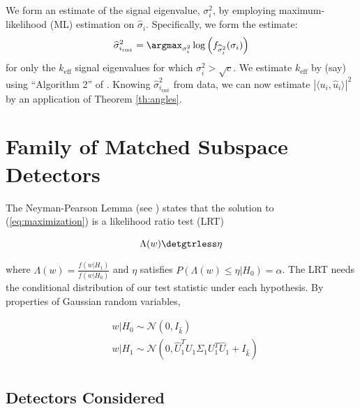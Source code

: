 We form an estimate of the signal eigenvalue, $\sigma_{i}^{2}$, by employing maximum-likelihood (ML) estimation on $\widehat{\sigma}_i$. Specifically, we form the estimate:
\begin{equation}\label{eq:cov}
\widehat{\sigma}^2_{i_\text{rmt}} = \argmax_{\sigma_i^2} \log\left(f_{\widehat{\sigma}_i^2}(\sigma_i)\right)
\end{equation}
for only the $k_\text{eff}$ signal eigenvalues for which $\sigma_i^2 > \sqrt{c}$.  We estimate $k_\text{eff}$ by (say) using ``Algorithm 2'' of  \cite{nadakuditi2010fundamental}.  Knowing $\widehat{\sigma}^2_{i_\text{rmt}}$ from data, we can now estimate $|\langle u_i,\widehat{u}_i\rangle|^2$ by an application of Theorem \ref{th:angles}.


\section{Family of Matched Subspace Detectors}\label{sec:detectors}

The Neyman-Pearson Lemma (see \cite{van1968detection}) states that the solution to (\ref{eq:maximization}) is a likelihood ratio test (LRT)

\begin{equation*}
\Lambda(w) \detgtrless \eta
\end{equation*}

where $\Lambda(w) = \frac{f(w|H_1)}{f(w|H_0)}$ and $\eta$ satisfies $P(\Lambda(w)\leq\eta|H_0)=\alpha$. The LRT needs the conditional distribution of our test statistic under each hypothesis. By properties of Gaussian random variables,

\begin{equation*}
\begin{aligned}
&w|H_0\sim\mathcal{N}(0,I_{\widehat{k}})\\
&w|H_1\sim\mathcal{N}(0, \widehat{U}_1^TU_1\Sigma_1U_1^T\widehat{U}_1 +I_{\widehat{k}})\\
\end{aligned}
\end{equation*}

\subsection{Detectors Considered}\label{sec:main results}

